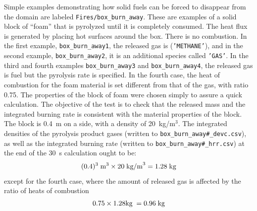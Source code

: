 \documentclass[11pt]{book}
\newcommand{\ct}{\tt\small}
\newcommand{\be}{\begin{equation}}
\newcommand{\ee}{\end{equation}}
\begin{document}
Simple examples demonstrating how solid fuels can be forced to disappear from the domain are labeled {\ct Fires/box\_burn\_away}.
These are examples of a solid block of ``foam'' that is pyrolyzed
until it is completely consumed. The heat flux is generated by placing
hot surfaces around the box. There is no combustion.  In the first
example, {\ct box\_burn\_away1}, the released gas is ({\ct 'METHANE'}),
and in the second example, {\ct box\_burn\_away2}, it is an additional
species called {\ct 'GAS'}. In the third and fourth examples
{\ct box\_burn\_away3} and {\ct box\_burn\_away4}, the
released gas is fuel but the pyrolysis rate is specified.
In the fourth case, the heat of combustion for the foam material is set
different from that of the gas, with ratio 0.75.
The properties of the block of foam were chosen
simply to assure a quick calculation. The objective of the test is to
check that the released mass and the integrated burning rate is
consistent with the material properties of the block. The block is
0.4~m on a side, with a density of 20~kg/m$^3$.  The integrated
densities of the pyrolysis product gases (written to
{\ct box\_burn\_away\#\_devc.csv}), as well as
the integrated burning rate (written to {\ct box\_burn\_away\#\_hrr.csv}) at
the end of the 30~s calculation ought to be:
\be
(0.4)^3 \; \hbox{m}^3 \times 20 \; \hbox{kg/m}^3 = 1.28 \; \hbox{kg}
\ee
except for the fourth case, where the amount of released gas is affected by
the ratio of heats of combustion
\be
0.75\times 1.28 \hbox{kg}\; = 0.96\; \hbox{kg}
\ee
\end{document}
